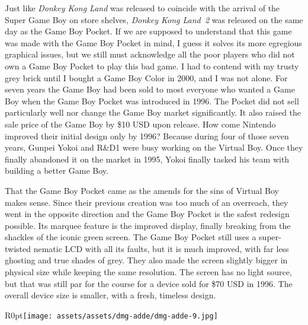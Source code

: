 \documentclass{book}
\begin{document}
Just like \emph{Donkey Kong Land} was released to coincide with the arrival of the Super Game Boy on store shelves, \emph{Donkey Kong Land~2} was released on the same day as the Game Boy Pocket. If we are supposed to understand that this game was made with the Game Boy Pocket in mind, I guess it solves its more egregious graphical issues, but we still must acknowledge all the poor players who did not own a Game Boy Pocket to play this bad game. I had to contend with my trusty grey brick until I bought a Game Boy Color in 2000, and I was not alone. For seven years the Game Boy had been sold to most everyone who wanted a Game Boy when the Game Boy Pocket was introduced in 1996. The Pocket did not sell particularly well nor change the Game Boy market significantly. It also raised the sale price of the Game Boy by \$10 USD upon release. How come Nintendo improved their initial design only by 1996? Because during four of those seven years, Gunpei Yokoi and R\&D1 were busy working on the Virtual Boy. Once they finally abandoned it on the market in 1995, Yokoi finally tasked his team with building a better Game Boy.\par
\FloatBarrier\vspace{\baselineskip}\begin{figure}[H]\end{figure}
That the Game Boy Pocket came as the amends for the sins of Virtual Boy makes sense. Since their previous creation was too much of an overreach, they went in the opposite direction and the Game Boy Pocket is the safest redesign possible. Its marquee feature is the improved display, finally breaking from the shackles of the iconic green screen. The Game Boy Pocket still uses a super-twisted nematic LCD with all its faults, but it is much improved, with far less ghosting and true shades of grey. They also made the screen slightly bigger in physical size while keeping the same resolution. The screen has no light source, but that was still par for the course for a device sold for \$70 USD in 1996. The overall device size is smaller, with a fresh, timeless design.\par
\begin{wrapfigure}{R}{0pt}{\texttt{[image: assets/assets/dmg-adde/dmg-adde-9.jpg]}}\end{wrapfigure}
\end{document}
